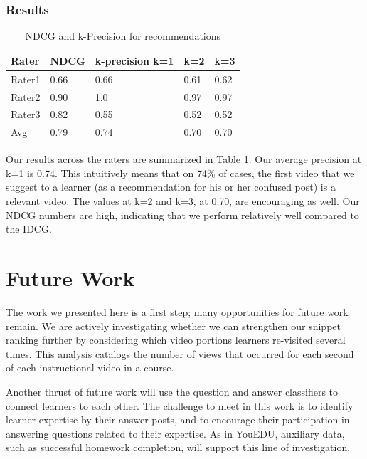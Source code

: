\documentclass{edm_template}
\begin{document}
\subsubsection{Results}
\begin{table}
    \begin{tabular}{|l|l|l|l|l|}
    \hline
    Rater  & NDCG & k-precision k=1 & k=2  & k=3  \\ \hline
    Rater1 & 0.66 & 0.66            & 0.61 & 0.62 \\ \hline
    Rater2 & 0.90 & 1.0             & 0.97 & 0.97 \\ \hline
    Rater3 & 0.82 & 0.55            & 0.52 & 0.52 \\ \hline
    Avg    & 0.79 & 0.74            & 0.70 & 0.70 \\ \hline
    \end{tabular}
    \vspace{-5pt}
    \caption {NDCG and k-Precision for recommendations}
\label{table:ndcg}
\end{table}

Our results across the raters are summarized in Table \ref{table:ndcg}. Our average precision at k=1 is 0.74. This intuitively means that on 74\% of cases, the first video that we suggest to a learner (as a recommendation for his or her confused post) is a relevant video. The values at k=2 and k=3, at 0.70, are encouraging as well. Our NDCG numbers are high, indicating that we perform relatively well compared to the IDCG.

\section{Future Work}
\label{sec:futureWork}

The work we presented here is a first step; many opportunities for
future work remain. We are actively investigating whether we can
strengthen our snippet ranking further by considering which
video portions learners re-visited several times. This analysis
catalogs the number of views that occurred for each second of each
instructional video in a course.

Another thrust of future work will use the question and answer
classifiers to connect learners to each other. The challenge
to meet in this work is to identify learner expertise by their answer
posts, and to encourage their participation in answering questions
related to their expertise. As in YouEDU, auxiliary data, such as
successful homework completion, will support this line of
investigation.
\end{document}
